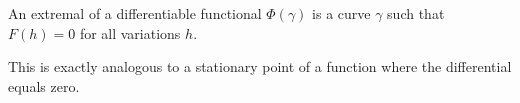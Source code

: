 An extremal of a differentiable functional $\Phi(\gamma)$ is a curve $\gamma$ such that $F(h) = 0$ for all variations $h$.

This is exactly analogous to a stationary point of a function where the differential equals zero.
